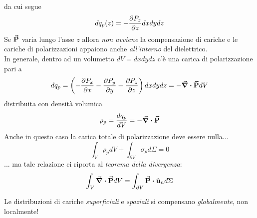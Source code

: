 da cui segue
\begin{equation*}
	dq_{p}(z)=-\pdv{P_z}{z}dxdydz
\end{equation*}
Se $\vb*{\va{P}}$ varia lungo l'asse $z$ allora \textit{non avviene} la compensazione di cariche e le cariche di polarizzazioni appaiono anche \textit{all'interno} del dielettrico.\\
In generale, dentro ad un volumetto $dV=dxdydz$ c'è una carica di polarizzazione pari a
\begin{equation*}
	dq_{p}=\left(-\pdv{P_x}{x}-\pdv{P_y}{y}-\pdv{P_z}{z}\right)dxdydz=-\div{\vb*{\va{P}}}dV
\end{equation*}
distribuita con densità volumica
\begin{equation}
	\rho_p=\frac{dq_{p}}{dV}=-\div{\vb*{\va{P}}}
\end{equation}
Anche in questo caso la carica totale di polarizzazione deve essere nulla...
\begin{equation}
	\int_V\rho_p dV+\int_{\partial V}\sigma_p d\Sigma=0
\end{equation}
... ma tale relazione ci riporta al \textit{teorema della divergenza}:
\begin{equation}
	\int_V \div{\vba{P}} dV = \int_{\partial V} \vba{P}\vdot\vbh{u}_nd\Sigma
\end{equation}
\begin{attention}
	Le distribuzioni di cariche \textit{superficiali} e \textit{spaziali} si compensano \textit{globalmente}, non localmente!
\end{attention}
